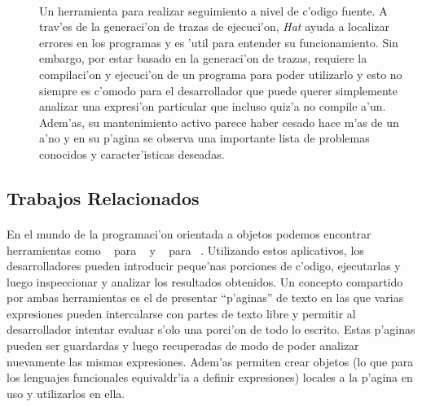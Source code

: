 \documentclass[a4paper]{article}
\begin{document}
\begin{description}
	\item[~\cite{hat}]
		Un herramienta para realizar seguimiento a nivel de c'odigo fuente.  A trav'es de la generaci'on de trazas de ejecuci'on, \textit{Hat} ayuda a localizar errores en los programas y es 'util para entender su funcionamiento.  Sin embargo, por estar basado en la generaci'on de trazas, requiere la compilaci'on y ejecuci'on de un programa para poder utilizarlo y esto no siempre es c'omodo para el desarrollador que puede querer simplemente analizar una expresi'on particular que incluso quiz'a no compile a'un.  Adem'as, su mantenimiento activo parece haber cesado hace m'as de un a'no y en su p'agina se observa una importante lista de problemas conocidos y caracter'isticas deseadas.
\end{description}

\subsection{Trabajos Relacionados}
\begin{epigraphs}
\end{epigraphs}
\paragraph{}En el mundo de la programaci'on orientada a objetos podemos encontrar herramientas como ~\cite{javascrapbook} para ~\cite{java} y ~\cite{insidesmalltalk, smalltalkworkspace} para ~\cite{smalltalk}.  Utilizando estos aplicativos, los desarrolladores pueden introducir peque'nas porciones de c'odigo, ejecutarlas y luego inspeccionar y analizar los resultados obtenidos.  Un concepto compartido por ambas herramientas es el de presentar ``p'aginas'' de texto en las que varias expresiones pueden intercalarse con partes de texto libre y permitir al desarrollador intentar evaluar s'olo una porci'on de todo lo escrito.  Estas p'aginas pueden ser guardardas y luego recuperadas de modo de poder analizar nuevamente las mismas expresiones.  Adem'as permiten crear objetos (lo que para los lenguajes funcionales equivaldr'ia a definir expresiones) locales a la p'agina en uso y utilizarlos en ella.
\end{document}

